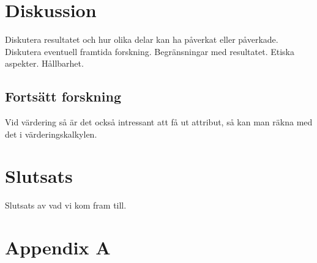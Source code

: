 \documentclass{kththesis}
\begin{document}
\chapter{Diskussion}
Diskutera resultatet och hur olika delar kan ha påverkat eller påverkade. Diskutera eventuell framtida forskning. Begränsningar med resultatet.
Etiska aspekter. Hållbarhet. 

  \section{Fortsätt forskning}
  Vid värdering så är det också intressant att få ut attribut, så kan man räkna med det i värderingskalkylen.

\chapter{Slutsats}
Slutsats av vad vi kom fram till.

\printbibliography[heading=bibintoc]
\appendix
  \chapter{Appendix A}

\tailmatter
\end{document}
